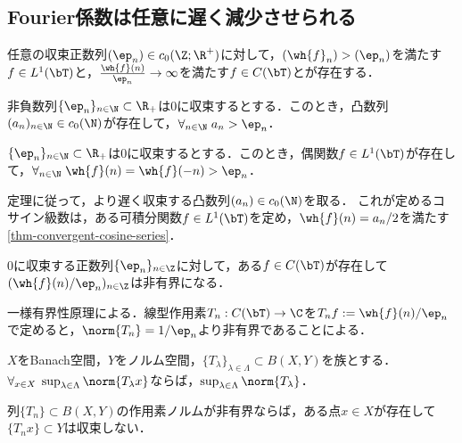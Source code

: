 \documentclass[uplatex,dvipdfmx]{jsreport}
\begin{document}
\subsection{Fourier係数は任意に遅く減少させられる}

\begin{tcolorbox}[colframe=ForestGreen, colback=ForestGreen!10!white,breakable,colbacktitle=ForestGreen!40!white,coltitle=black,fonttitle=\bfseries\sffamily,
title=]
    任意の収束正数列$(\ep_n)\in c_0(\Z;\R^+)$に対して，$(\wh{f}_n)>(\ep_n)$を満たす$f\in L^1(\bT)$と，$\frac{\wh{f}(n)}{\ep_n}\to\infty$を満たす$f\in C(\bT)$とが存在する．
\end{tcolorbox}

\begin{theorem}[任意に遅く収束する凸数列の構成算譜]
    非負数列$\{\ep_n\}_{n\in\N}\subset\R_+$は$0$に収束するとする．このとき，凸数列$(a_n)_{n\in\N}\in c_0(\N)$が存在して，$\forall_{n\in\N}\;a_n>\ep_n$．
\end{theorem}

\begin{corollary}[任意に遅く収束するFourier係数を持つ偶関数]\label{cor-image-of-Fourier-transform}
    $\{\ep_n\}_{n\in\N}\subset\R_+$は$0$に収束するとする．このとき，偶関数$f\in L^1(\bT)$が存在して，$\forall_{n\in\N}\;\wh{f}(n)=\wh{f}(-n)>\ep_n$．
\end{corollary}
\begin{Proof}
    定理に従って，より遅く収束する凸数列$(a_n)\in c_0(\N)$を取る．
    これが定めるコサイン級数は，ある可積分関数$f\in L^1(\bT)$を定め，$\wh{f}(n)=a_n/2$を満たす\ref{thm-convergent-cosine-series}．
\end{Proof}

\begin{theorem}\label{thm-image-of-Fourier-transform}
    $0$に収束する正数列$\{\ep_n\}_{n\in\Z}$に対して，ある$f\in C(\bT)$が存在して$(\wh{f}(n)/\ep_n)_{n\in\Z}$は非有界になる．
\end{theorem}
\begin{Proof}
    一様有界性原理による．線型作用素$T_n:C(\bT)\to\C$を$T_nf:=\wh{f}(n)/\ep_n$で定めると，$\norm{T_n}=1/\ep_n$より非有界であることによる．
\end{Proof}

\begin{lemma}
    $X$をBanach空間，$Y$をノルム空間，$\{T_\lambda\}_{\lambda\in\Lambda}\subset B(X,Y)$を族とする．
    $\forall_{x\in X}\;\sup_{\lambda\in\Lambda}\norm{T_\lambda x}$ならば，$\sup_{\lambda\in\Lambda}\norm{T_\lambda}$．
\end{lemma}
\begin{corollary}
    列$\{T_n\}\subset B(X,Y)$の作用素ノルムが非有界ならば，ある点$x\in X$が存在して$\{T_nx\}\subset Y$は収束しない．
\end{corollary}
\end{document}
